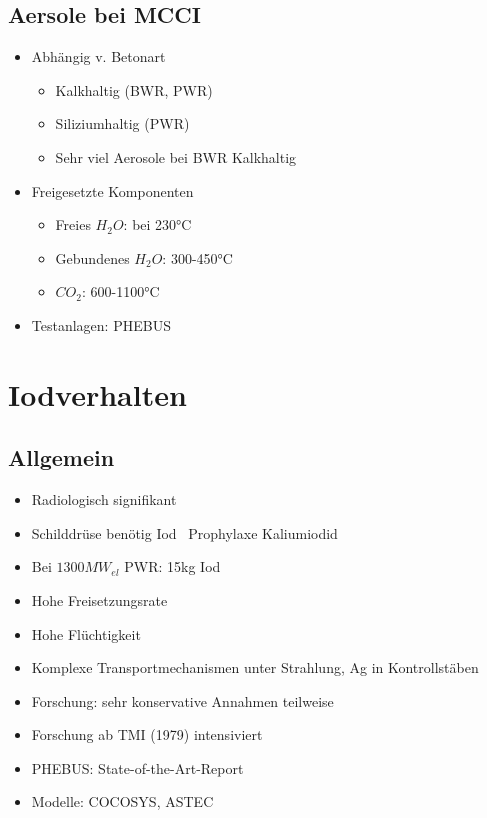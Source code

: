 \documentclass[12pt]{article}
\begin{document}
\subsection{Aersole bei MCCI}
\begin{itemize}
	\item Abhängig v. Betonart
		\begin{itemize}
			\item Kalkhaltig (BWR, PWR)
			\item Siliziumhaltig (PWR)
			\item Sehr viel Aerosole bei BWR Kalkhaltig
		\end{itemize}
	\item Freigesetzte Komponenten
		\begin{itemize}
			\item Freies \(H_2O\): bei 230°C
			\item Gebundenes \(H_2O\): 300-450°C
			\item \(CO_2\): 600-1100°C
		\end{itemize}
	\item Testanlagen: PHEBUS
\end{itemize}

\section{Iodverhalten}

\subsection{Allgemein}
\begin{itemize}
	\item Radiologisch signifikant
	\item Schilddrüse benötig Iod \textrightarrow\ Prophylaxe Kaliumiodid
	\item Bei \(1300 MW_{el}\) PWR: 15kg Iod
	\item Hohe Freisetzungsrate
	\item Hohe Flüchtigkeit
	\item Komplexe Transportmechanismen unter Strahlung, Ag in Kontrollstäben
	\item Forschung: sehr konservative Annahmen teilweise
	\item Forschung ab TMI (1979) intensiviert
	\item PHEBUS: State-of-the-Art-Report
	\item Modelle: COCOSYS, ASTEC
\end{itemize}
\end{document}
